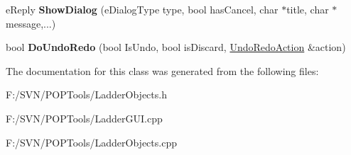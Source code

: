 \begin{DoxyCompactItemize}
\item 
\hypertarget{class_ladder_diagram_a75978cac4dd36a30dac76f324fc3858c}{e\-Reply {\bfseries Show\-Dialog} (e\-Dialog\-Type type, bool has\-Cancel, char $\ast$title, char $\ast$message,...)}\label{class_ladder_diagram_a75978cac4dd36a30dac76f324fc3858c}

\item 
\hypertarget{class_ladder_diagram_a52e642fd61ef83a4c600924959e01c21}{bool {\bfseries Do\-Undo\-Redo} (bool Is\-Undo, bool is\-Discard, \hyperlink{struct_undo_redo_action}{Undo\-Redo\-Action} \&action)}\label{class_ladder_diagram_a52e642fd61ef83a4c600924959e01c21}

\end{DoxyCompactItemize}


The documentation for this class was generated from the following files\-:\begin{DoxyCompactItemize}
\item 
F\-:/\-S\-V\-N/\-P\-O\-P\-Tools/Ladder\-Objects.\-h\item 
F\-:/\-S\-V\-N/\-P\-O\-P\-Tools/Ladder\-G\-U\-I.\-cpp\item 
F\-:/\-S\-V\-N/\-P\-O\-P\-Tools/Ladder\-Objects.\-cpp\end{DoxyCompactItemize}
